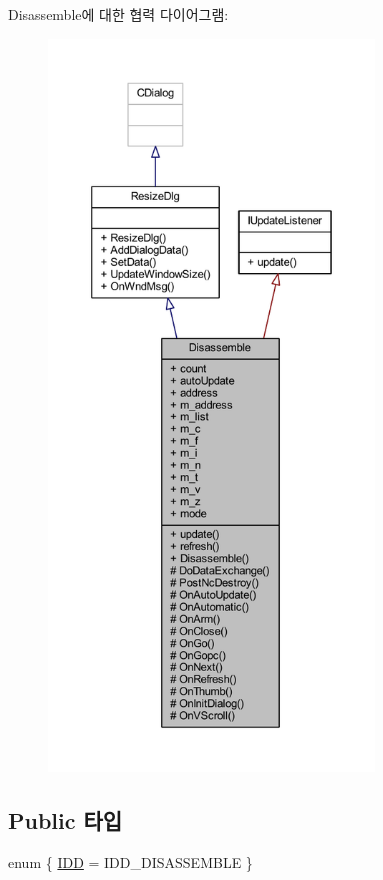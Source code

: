 Disassemble에 대한 협력 다이어그램\+:\nopagebreak
\begin{figure}[H]
\begin{center}
\leavevmode
\includegraphics[height=550pt]{class_disassemble__coll__graph}
\end{center}
\end{figure}
\subsection*{Public 타입}
\begin{DoxyCompactItemize}
\item 
enum \{ \mbox{\hyperlink{class_disassemble_ad63913a23ece149e6d04f14419966822a45935fbccc51ff059b05e4200a30d08d}{I\+DD}} = I\+D\+D\+\_\+\+D\+I\+S\+A\+S\+S\+E\+M\+B\+LE
 \}
\end{DoxyCompactItemize}
